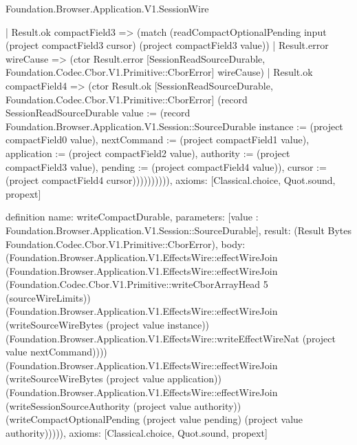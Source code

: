 \begin{lexlean}{Foundation.Browser.Application.V1.SessionWire}
\begin{semanticmodule}
{              | Result.ok compactField3 => (match (readCompactOptionalPending input (project compactField3 cursor) (project compactField3 value))
                | Result.error wireCause => (ctor Result.error [SessionReadSourceDurable, Foundation.Codec.Cbor.V1.Primitive::CborError] wireCause)
                | Result.ok compactField4 => (ctor Result.ok [SessionReadSourceDurable, Foundation.Codec.Cbor.V1.Primitive::CborError] (record SessionReadSourceDurable {value := (record Foundation.Browser.Application.V1.Session::SourceDurable {instance := (project compactField0 value), nextCommand := (project compactField1 value), application := (project compactField2 value), authority := (project compactField3 value), pending := (project compactField4 value)}), cursor := (project compactField4 cursor)}))))))))),
  axioms: [Classical.choice, Quot.sound, propext]
}

definition{
  name: writeCompactDurable,
  parameters: [value : Foundation.Browser.Application.V1.Session::SourceDurable],
  result: (Result Bytes Foundation.Codec.Cbor.V1.Primitive::CborError),
  body: (Foundation.Browser.Application.V1.EffectsWire::effectWireJoin (Foundation.Browser.Application.V1.EffectsWire::effectWireJoin (Foundation.Codec.Cbor.V1.Primitive::writeCborArrayHead 5 (sourceWireLimits)) (Foundation.Browser.Application.V1.EffectsWire::effectWireJoin (writeSourceWireBytes (project value instance)) (Foundation.Browser.Application.V1.EffectsWire::writeEffectWireNat (project value nextCommand)))) (Foundation.Browser.Application.V1.EffectsWire::effectWireJoin (writeSourceWireBytes (project value application)) (Foundation.Browser.Application.V1.EffectsWire::effectWireJoin (writeSessionSourceAuthority (project value authority)) (writeCompactOptionalPending (project value pending) (project value authority))))),
  axioms: [Classical.choice, Quot.sound, propext]
}


\end{semanticmodule}
\end{lexlean}
